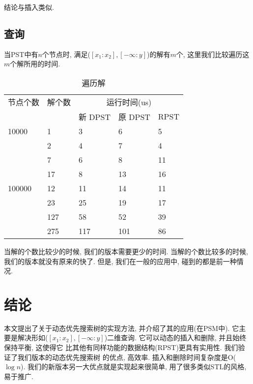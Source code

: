 \documentclass[a4paper]{article}
\begin{document}
结论与插入类似. 

\subsection{查询}
当PST中有$n$个节点时, 满足($[x_1:x_2],[-\infty:y]$)的解有$m$个, 这里我们比较遍历这$m$个解所用的时间. 

\begin{table}[ht]
\centering
\begin{tabular}{|p{1.2cm}|p{1.1cm}|p{1.1cm}|p{1.1cm}|p{1.1cm}|}
\hline 节点个数 & 解个数 & \multicolumn{3}{|c|}{运行时间(us)}\\
\cline{3-5}
    && 新 DPST & 原 DPST & RPST\\
\hline 10000 & 1 & 3 & 6 & 5\\
\cline{2-5}      & 2 & 4 & 7  & 4\\
\cline{2-5}      & 7 & 6 & 8 & 11\\
\cline{2-5}      & 17 & 8 & 13 & 16\\
\hline 100000 & 12 & 11 & 14 & 11\\
\cline{2-5}      & 23 & 25 & 19  & 17\\
\cline{2-5}      & 127 & 58 & 52 & 39\\
\cline{2-5}      & 275 & 117 & 101 & 86\\
\hline
\end{tabular}
\caption{遍历解}
\end{table}

当解的个数比较少的时候, 我们的版本需要更少的时间. 当解的个数比较多的时候, 我们的版本就没有原来的快了. 但是, 我们在一般的应用中, 碰到的都是前一种情况. 

\section{结论}
本文提出了关于动态优先搜索树的实现方法, 并介绍了其的应用(在PSM中). 它主要是解决形如($[x_1:x_2],[-\infty:y]$)二维查询. 它可以动态的插入和删除, 并且始终保持平衡, 这使得它
比其他有同样功能的数据结构(RPST)更具有实用性. 我们验证了我们版本的动态优先搜索树
的优点, 高效率. 插入和删除时间复杂度是O($\log n$). 我们的新版本另一大优点就是实现起来很简单, 
用了很多类似STL的风格, 易于推广. 




\end{document}
